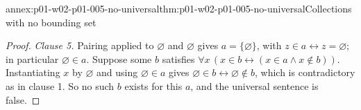 \begin{annexitem}{annex:p01-w02-p01-005-no-universal}{thm:p01-w02-p01-005-no-universal}{Collections with no bounding set}
\begin{proof}
\emph{Clause 5.} Pairing applied to \(\varnothing\) and \(\varnothing\) gives
\(a=\{\varnothing\}\), with \(z\in a\leftrightarrow z=\varnothing\); in
particular \(\varnothing\in a\). Suppose some \(b\) satisfies
\(\forall x\,(x\in b\leftrightarrow(x\in a\land x\notin b))\). Instantiating
\(x\) by \(\varnothing\) and using \(\varnothing\in a\) gives
\(\varnothing\in b\leftrightarrow\varnothing\notin b\), which is contradictory
as in clause 1. So no such \(b\) exists for this \(a\), and the universal
sentence is false.
\end{proof}
\end{annexitem}
